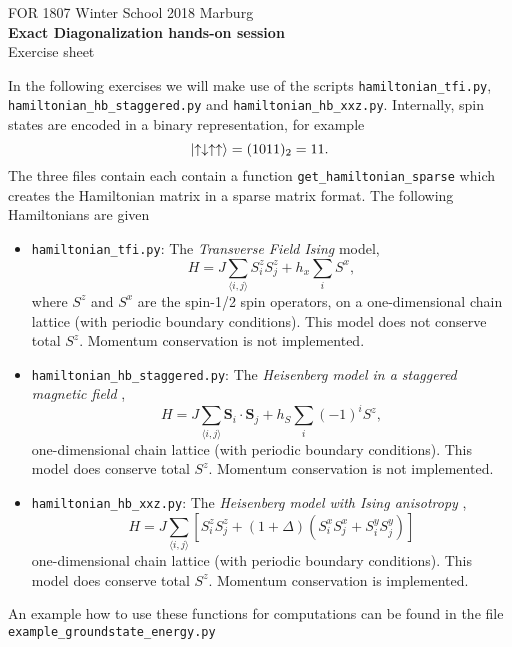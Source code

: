 \documentclass[]{article}
\theoremstyle{definition}
\begin{document}
\begin{center}
  {FOR 1807 Winter School 2018 Marburg}\\
  \textbf{Exact Diagonalization hands-on
    session}\\ %
  Exercise sheet%
\end{center}

\vspace{0.2 cm}

In the following exercises we will make use of the scripts
\texttt{hamiltonian\_tfi.py}, \texttt{hamiltonian\_hb\_staggered.py}
and \texttt{hamiltonian\_hb\_xxz.py}. Internally, spin states are
encoded in a binary representation, for example
\begin{equation}
  \ket{\uparrow\downarrow\uparrow \uparrow} = (1011)_2 = 11.
\end{equation}
The three files contain each contain a function
\texttt{get\_hamiltonian\_sparse} which creates the Hamiltonian matrix
in a sparse matrix format. The following Hamiltonians are given
\begin{itemize}
\item \texttt{hamiltonian\_tfi.py}: The \textit{Transverse Field
    Ising} model,
  \begin{equation}
    H = J\sum\limits_{\langle i , j \rangle} S^z_iS^z_j + h_x \sum\limits_{i}S^x,
  \end{equation}
  where $S^z$ and $S^x$ are the spin-1/2 spin operators, on a
  one-dimensional chain lattice (with periodic boundary conditions).
  This model does not conserve total $S^z$. Momentum conservation is
  not implemented.
\item \texttt{hamiltonian\_hb\_staggered.py}: The \textit{Heisenberg
    model in a staggered magnetic field} ,
  \begin{equation}
    \label{eq:hb_stag}
    H = J\sum\limits_{\langle i , j \rangle} \mathbf{S}_i\cdot\mathbf{S}_j + h_S \sum\limits_{i}(-1)^iS^z,
  \end{equation}
  one-dimensional chain lattice (with periodic boundary conditions).
  This model does conserve total $S^z$. Momentum conservation is not
  implemented.
\item \texttt{hamiltonian\_hb\_xxz.py}: The \textit{Heisenberg model
    with Ising anisotropy} ,
  \begin{equation}
    \label{eq:hb_xxz}
    H = J\sum\limits_{\langle i , j \rangle} \left[S^z_iS^z_j +
      (1+\Delta)\left(S^x_iS^x_j + S^y_iS^y_j\right)\right]
  \end{equation}
  one-dimensional chain lattice (with periodic boundary conditions).
  This model does conserve total $S^z$. Momentum conservation is
  implemented.
\end{itemize}
An example how to use these functions for computations can be found in
the file \texttt{example\_groundstate\_energy.py}
\newpage
\end{document}
